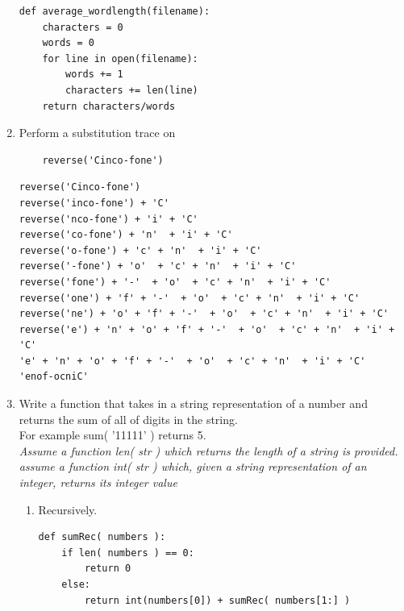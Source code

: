 \documentclass[11pt]{article}
\newenvironment{answer}{\large\lstset{basicstyle=\large}\color{white}}{}
\newenvironment{answer}{\large\lstset{basicstyle=\large}\color{red}}{}
\begin{document}
\begin{enumerate}
\begin{answer}
\begin{lstlisting}
def average_wordlength(filename):
    characters = 0
    words = 0
    for line in open(filename):
        words += 1
        characters += len(line)
    return characters/words
\end{lstlisting}
\end{answer}

    \item Perform a substitution trace on 
    \begin{lstlisting}
    reverse('Cinco-fone')
    \end{lstlisting}

\begin{answer}
\begin{lstlisting}
reverse('Cinco-fone')
reverse('inco-fone') + 'C'
reverse('nco-fone') + 'i' + 'C'
reverse('co-fone') + 'n'  + 'i' + 'C'
reverse('o-fone') + 'c' + 'n'  + 'i' + 'C'
reverse('-fone') + 'o'  + 'c' + 'n'  + 'i' + 'C'
reverse('fone') + '-'  + 'o'  + 'c' + 'n'  + 'i' + 'C'
reverse('one') + 'f' + '-'  + 'o'  + 'c' + 'n'  + 'i' + 'C'
reverse('ne') + 'o' + 'f' + '-'  + 'o'  + 'c' + 'n'  + 'i' + 'C'
reverse('e') + 'n' + 'o' + 'f' + '-'  + 'o'  + 'c' + 'n'  + 'i' + 'C'
'e' + 'n' + 'o' + 'f' + '-'  + 'o'  + 'c' + 'n'  + 'i' + 'C'
'enof-ocniC'

\end{lstlisting}
\pagebreak
\end{answer}
    \item Write a function that takes in a string representation of a number and returns the sum
        of all of digits in the string. \\For example sum( '11111' ) returns 5. \\
        \emph{Assume a function len( str ) which returns the length of a string is provided. \\
         assume a function int( str ) which, given a string representation of an integer, returns its integer value }

        \begin{enumerate}
            \item Recursively.
\begin{answer}
\begin{lstlisting}
def sumRec( numbers ):
    if len( numbers ) == 0:
        return 0
    else:
        return int(numbers[0]) + sumRec( numbers[1:] )
\end{lstlisting}
\end{answer}


\end{enumerate}
\end{enumerate}
\end{document}
